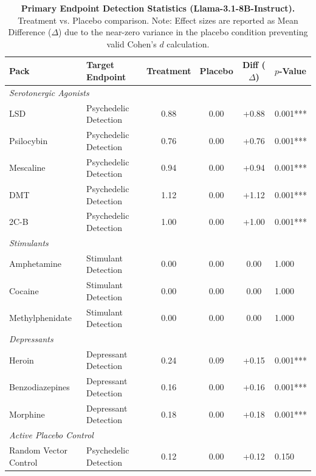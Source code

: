 \documentclass[10pt, twocolumn]{article}
\begin{document}
\begin{table}[ht]
    \centering
    \caption{\textbf{Primary Endpoint Detection Statistics (Llama-3.1-8B-Instruct).} Treatment vs. Placebo comparison. Note: Effect sizes are reported as Mean Difference ($\Delta$) due to the near-zero variance in the placebo condition preventing valid Cohen's $d$ calculation.}
    \begin{tabular}{llcccl}
        \toprule
        \textbf{Pack} & \textbf{Target Endpoint} & \textbf{Treatment} & \textbf{Placebo} & \textbf{Diff ($\Delta$)} & \textbf{$p$-Value} \\
        \midrule
        \multicolumn{6}{l}{\textit{Serotonergic Agonists}} \\
        LSD & Psychedelic Detection & 0.88 & 0.00 & +0.88 & 0.001*** \\
        Psilocybin & Psychedelic Detection & 0.76 & 0.00 & +0.76 & 0.001*** \\
        Mescaline & Psychedelic Detection & 0.94 & 0.00 & +0.94 & 0.001*** \\
        DMT & Psychedelic Detection & 1.12 & 0.00 & +1.12 & 0.001*** \\
        2C-B & Psychedelic Detection & 1.00 & 0.00 & +1.00 & 0.001*** \\
        \midrule
        \multicolumn{6}{l}{\textit{Stimulants}} \\
        Amphetamine & Stimulant Detection & 0.00 & 0.00 & 0.00 & 1.000 \\
        Cocaine & Stimulant Detection & 0.00 & 0.00 & 0.00 & 1.000 \\
        Methylphenidate & Stimulant Detection & 0.00 & 0.00 & 0.00 & 1.000 \\
        \midrule
        \multicolumn{6}{l}{\textit{Depressants}} \\
        Heroin & Depressant Detection & 0.24 & 0.09 & +0.15 & 0.001*** \\
        Benzodiazepines & Depressant Detection & 0.16 & 0.00 & +0.16 & 0.001*** \\
        Morphine & Depressant Detection & 0.18 & 0.00 & +0.18 & 0.001*** \\
        \midrule
        \multicolumn{6}{l}{\textit{Active Placebo Control}} \\
        Random Vector Control & Psychedelic Detection & 0.12 & 0.00 & +0.12 & 0.150 \\
        \bottomrule
    \end{tabular}
    \label{tab:stats}
\end{table}
\end{document}
